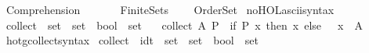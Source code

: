 %
\begin{isabellebody}%
%
%
\isadelimdocument
%
\endisadelimdocument
%
\isatagdocument
\isanewline
\isanewline
%
\isamarkuptrue%
%
\endisatagdocument
{\isafolddocument}%
%
\isadelimdocument
%
\endisadelimdocument
%
\isadelimtheory
%
\endisadelimtheory
%
\isatagtheory
{}\isamarkupfalse%
\ Comprehension\isanewline
\ \ \isanewline
\ \ \ \ Finite{\isacharunderscore}{\kern0pt}Sets\isanewline
\ \ \ \ Order{\isacharunderscore}{\kern0pt}Set\isanewline
{}%
\endisatagtheory
{\isafoldtheory}%
%
\isadelimtheory
\isanewline
%
\endisadelimtheory
\isanewline
{}\isamarkupfalse%
\ no{\isacharunderscore}{\kern0pt}HOL{\isacharunderscore}{\kern0pt}ascii{\isacharunderscore}{\kern0pt}syntax\isanewline
\isanewline
{}\isamarkupfalse%
\ collect\ {\isacharcolon}{\kern0pt}{\isacharcolon}{\kern0pt}\ {\isacartoucheopen}set\ {\isasymRightarrow}\ {\isacharparenleft}{\kern0pt}set\ {\isasymRightarrow}\ bool{\isacharparenright}{\kern0pt}\ {\isasymRightarrow}\ set{\isacartoucheclose}\isanewline
\ \ \ {\isachardoublequoteopen}collect\ A\ P\ {\isasymequiv}\ {\isasymUnion}{\isacharbraceleft}{\kern0pt}if\ P\ x\ then\ {\isacharbraceleft}{\kern0pt}x{\isacharbraceright}{\kern0pt}\ else\ {\isacharbraceleft}{\kern0pt}{\isacharbraceright}{\kern0pt}\ {\isacharbar}{\kern0pt}\ x\ {\isasymin}\ A{\isacharbraceright}{\kern0pt}{\isachardoublequoteclose}\isanewline
\isanewline
{}\isamarkupfalse%
\ hotg{\isacharunderscore}{\kern0pt}collect{\isacharunderscore}{\kern0pt}syntax\isanewline
{}\isanewline
{}\isamarkupfalse%
\ {\isachardoublequoteopen}{\isacharunderscore}{\kern0pt}collect{\isachardoublequoteclose}\ {\isacharcolon}{\kern0pt}{\isacharcolon}{\kern0pt}\ {\isacartoucheopen}idt\ {\isasymRightarrow}\ set\ {\isasymRightarrow}\ {\isacharparenleft}{\kern0pt}set\ {\isasymRightarrow}\ bool{\isacharparenright}{\kern0pt}\ {\isasymRightarrow}\ set{\isacartoucheclose}\ {\isacharparenleft}{\kern0pt}{\isachardoublequoteopen}{\isacharparenleft}{\kern0pt}{}{\isacharbraceleft}{\kern0pt}{\isacharunderscore}{\kern0pt}\ {\isasymin}\ {\isacharunderscore}{\kern0pt}\ {\isacharbar}{\kern0pt}{\isacharslash}{\kern0pt}\ {\isacharunderscore}{\kern0pt}{\isacharbraceright}{\kern0pt}{\isacharparenright}{\kern0pt}{\isachardoublequoteclose}{\isacharparenright}{\kern0pt}\isanewline
{}\isamarkupfalse%
\isanewline
{}\isamarkupfalse%

\end{isabellebody}
